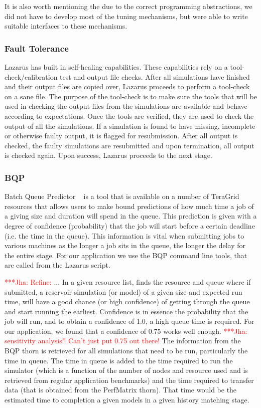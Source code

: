 \documentclass[conference,final]{IEEEtran}
\newcommand{\jhanote}[1]{ {\textcolor{red} { ***Jha: #1 }}}
\begin{document}
It is also worth mentioning the due to the correct programming
abstractions, we did not have to develop most of the tuning
mechanisms, but were able to write suitable interfaces to these
mechanisms.

\subsubsection{Fault Tolerance}
Lazarus has built in self-healing capabilities. These capabilities
rely on a tool-check/calibration test and output file checks. After
all simulations have finished and their output files are copied over,
Lazarus proceeds to perform a tool-check on a sane file. The purpose
of the tool-check is to make sure the tools that will be used in
checking the output files from the simulations are available and
behave according to expectations. Once the tools are verified, they
are used to check the output of all the simulations. If a simulation
is found to have missing, incomplete or otherwise faulty output, it is
flagged for resubmission.  After all output is checked, the faulty
simulations are resubmitted and upon termination, all output is
checked again. Upon success, Lazarus proceeds to the next stage.

\subsubsection{BQP}
Batch Queue Predictor ~\cite{bqp} is a tool that is available on a
number of TeraGrid resources that allows users to make bound
predictions of how much time a job of a giving size and duration will
spend in the queue.  This prediction is given with a degree of
confidence (probability) that the job will start before a certain
deadline (i.e. the time in the queue).  This information is vital when
submitting jobs to various machines as the longer a job sits in the
queue, the longer the delay for the entire stage.  For our application
we use the BQP command line tools, that are called from the Lazarus
script.

\jhanote{Refine: } ... In a given resource list, finds the resource and
  queue where if submitted, a reservoir simulation (or model) of a
  given size and expected run time, will have a good chance (or high
  confidence) of getting through the queue and start running the
  earliest. Confidence is in essence the probability that the job will
  run, and to obtain a confidence of 1.0, a high queue time is
  required. For our application, we found that a confidence of 0.75
  works well enough.  \jhanote{sensitivity analysis!! Can't just put
    0.75 out there!}  The information from the BQP thorn is retrieved
  for all simulations that need to be run, particularly the time in
  queue. The time in queue is added to the time required to run the
  simulator (which is a function of the number of nodes and resource
  used and is retrieved from regular application benchmarks) and the
  time required to transfer data (that is obtained from the PerfMatrix
  thorn).  That time would be the estimated time to completion a given
  models in a given history matching stage.
\end{document}
